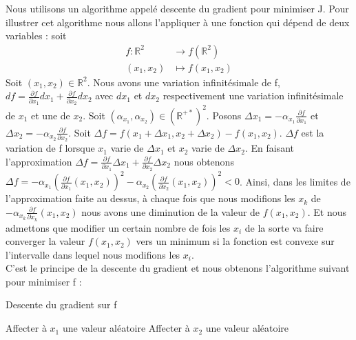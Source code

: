 \documentclass[a4paper,10pt]{article}
\begin{document}
Nous utilisons un algorithme appelé descente du gradient pour minimiser J. Pour illustrer cet algorithme nous allons l'appliquer à une fonction qui dépend de deux variables : soit
\begin{align*}
f\colon \mathbb{R}^2&\longrightarrow f(\mathbb{R}^2)\\
(x_1, x_2)&\longmapsto f(x_1, x_2)
\end{align*}
Soit $(x_1, x_2) \in \mathbb{R}^2$. Nous avons une variation infinitésimale de f, $df = \frac{\partial f}{\partial x_{1}}d x_{1} + \frac{\partial f}{\partial x_{2}}dx_{2}$ avec $dx_1$ et $dx_2$ respectivement une variation infinitésimale de $x_1$ et une de $x_2$. 
Soit $(\alpha_{x_1}, \alpha_{x_2}) \in (\mathbb{R}^{+*})^2$. 
 Posons $\Delta x_{1} = -\alpha_{x_1} \frac{\partial f}{\partial x_{1}}$
 et $\Delta x_{2} = -\alpha_{x_2} \frac{\partial f}{\partial x_{2}}$. Soit $\Delta f = f(x_1 + \Delta x_1, x_2 + \Delta x_2) - f(x_1, x_2)$. $\Delta f$ est la variation de f lorsque $x_1$ varie de $\Delta x_1$ et $x_2$ varie de $\Delta x_2$. 
En faisant l'approximation $\Delta f = \frac{\partial f}{\partial x_{1}}\Delta  x_{1} + \frac{\partial f}{\partial x_{2}}\Delta x_{2}$ nous obtenons $\Delta f = -\alpha_{x_1} (\frac{\partial f}{\partial x_{1}}(x_1, x_2))^{2} - \alpha_{x_2} (\frac{\partial f}{\partial x_{2}}(x_1, x_2))^{2} < 0$.
Ainsi, dans les limites de l'approximation faite au dessus, à chaque fois que nous modifions les $x_{k}$ de $- \alpha_{x_k} \frac{\partial f}{\partial x_{k}}(x_1, x_2)$
 nous avons une diminution de la valeur de $f(x_1, x_2)$. Et nous admettons que modifier un certain nombre de fois les $x_i$ de la sorte va faire converger la valeur $f(x_1, x_2)$ vers un minimum si la fonction est convexe sur l'intervalle dans lequel nous modifions les $x_i$.\\

C'est le principe de la descente du gradient et nous obtenons l'algorithme suivant pour minimiser f :
\begin{algorithm}
\caption{Descente du gradient sur f}
\BlankLine
Affecter à $x_1$ une valeur aléatoire\;
Affecter à $x_2$ une valeur aléatoire\;
\BlankLine
\end{algorithm}
\end{document}
